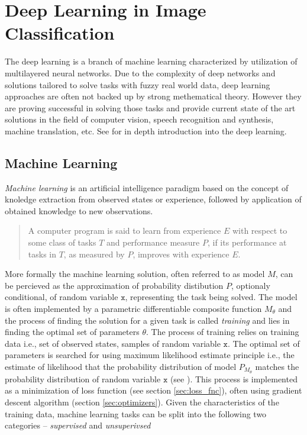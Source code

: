\section{Deep Learning in Image Classification}
\label{sec:deep_learning}
The deep learning is a branch of machine learning characterized by utilization of multilayered neural networks. Due to the complexity of deep networks and solutions tailored to solve tasks with fuzzy real world data, deep learning approaches are often not backed up by strong methematical theory. However they are proving successful in solving those tasks and provide current state of the art solutions in the field of computer vision, speech recognition and synthesis, machine translation, etc. See \cite{Goodfellow-et-al-2016} for in depth introduction into the deep learning.

\subsection{Machine Learning}
\emph{Machine learning} is an artificial intelligence paradigm based on the concept of knoledge extraction from observed states or experience, followed by application of obtained knowledge to new observations.

\begin{quotation}
A computer program is said to learn from experience $E$ with respect to some class of tasks $T$ and performance measure $P$, if its performance at tasks in $T$, as measured by $P$, improves with experience $E$. \cite{Mitchell-1997}
\end{quotation}

\noindent More formally the machine learning solution, often referred to as model $M$, can be percieved as the approximation of probability distibution $P$, optionaly conditional, of random variable $\mathtt{x}$, representing the task being solved. The model is often implemented by a parametric differentiable composite function $M_\theta$ and the process of finding the solution for a given task is called \emph{training} and lies in finding the optimal set of parameters $\theta$. The process of training relies on training data i.e., set of observed states, samples of random variable $\mathtt{x}$. The optimal set of parameters is searched for using maximum likelihood estimate principle i.e., the estimate of likelihood that the probability distribution of model $P_{M_\theta}$ matches the probability distribution of random variable $\mathtt{x}$ (see \cite{ml_flach}). This process is implemented as a minimization of loss function (see section \ref{sec:loss_fnc}), often using gradient descent algorithm (section \ref{sec:optimizers}). Given the characteristics of the training data, machine learning tasks can be split into the following two categories -- \emph{supervised} and \emph{unsuperivsed}

